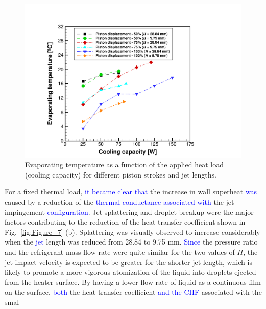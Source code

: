 \documentclass[review,preprint,12pt]{elsarticle}
\begin{document}
\begin{figure}[!htp]
\centering
\includegraphics[angle=0,scale=0.375]{Figure_8.pdf}
\caption{Evaporating temperature as a function of the applied heat load (cooling capacity) for different piston strokes and jet lengths.}
\label{fig:Figure_8}
\end{figure}

For a fixed thermal load, \textcolor{blue}{it became clear that} the increase in wall superheat \textcolor{blue}{was} caused by a reduction of the \textcolor{blue}{thermal conductance associated with} the jet impingement  \textcolor{blue}{configuration}. Jet splattering and droplet breakup were the major factors contributing to the reduction of the heat transfer coefficient shown in Fig.~\ref{fig:Figure_7} (b). Splattering was visually observed to increase considerably when the  \textcolor{blue}{jet} length was reduced from 28.84 to 9.75 mm.  \textcolor{blue}{Since} the pressure ratio and the refrigerant mass flow rate were quite similar for the two values of $H$, the jet impact velocity is expected to be greater for the shorter jet length, which is likely to promote a more vigorous atomization of the liquid into droplets ejected from the heater surface. By having a lower flow rate of liquid as a continuous film on the surface, \textcolor{blue}{both} the heat transfer coefficient \textcolor{blue}{and the CHF} associated with the smal
\end{document}
